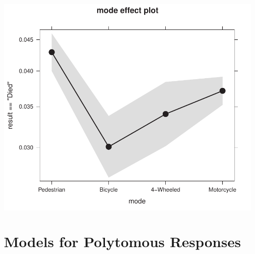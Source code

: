 \documentclass[10pt]{report}\usepackage[]{graphicx}\usepackage[]{color}
\newenvironment{knitrout}{}{} %
\renewenvironment{knitrout}{\small\renewcommand{\baselinestretch}{.85}}{} %
\begin{document}
\begin{Exercises}
\begin{enumerate*}
\begin{ans}
\begin{knitrout}
\centerline{\includegraphics[width=.5\textwidth]{soln/fig/ex7_7d4-1} }



\end{knitrout}

    \end{ans}
    
  \end{enumerate*}

%   

\end{Exercises}


\clearpage
\chapter[Models for Polytomous Responses]{Models for Polytomous \mbox{Responses}}\label{ch:polytomous}
\end{document}
